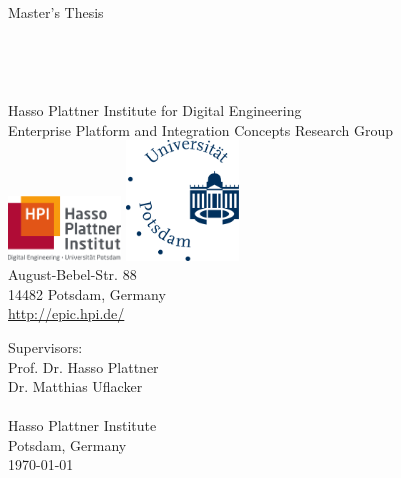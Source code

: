 \begin{titlepage}

\thispagestyle{empty}
\begin{center}
	\LARGE
	Master's Thesis\\
	\vspace{0.4cm}
	\Huge
    \TITLE{}\\
	\vspace{0.4cm}
	\large
    \SUBTITLE{}\\
	\vspace{0.5cm}
	\LARGE
	\textbf{\AUTHOR}\\
	\normalsize
  \Mail{\EMAIL}\\
	\vspace{0.4cm}
	\small
	Hasso Plattner Institute for Digital Engineering\\
	Enterprise Platform and Integration Concepts Research Group\\
	\vspace{0.4cm}
	\includegraphics[width=3cm]{figures/hpi_logo}
	\hspace{1cm}
	\includegraphics[width=3cm]{figures/Universitaet_Potsdam_logo}\\
	\vspace{0.4cm}
	August-Bebel-Str. 88\\
	14482 Potsdam, Germany\\
	\url{http://epic.hpi.de/}\\
\end{center}
Supervisors:
\vspace{0.4cm}\\
Prof. Dr. Hasso Plattner\\
Dr. Matthias Uflacker\\
\SUPERVISOR
\vspace{0.4cm}\\
Hasso Plattner Institute\\
Potsdam, Germany\\
\today
\end{titlepage}